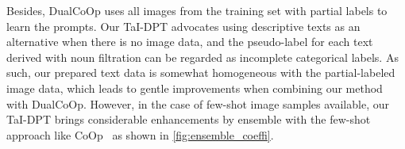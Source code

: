 \documentclass[10pt,twocolumn,letterpaper]{article}
\begin{document}
Besides, DualCoOp\cite{dualcoop} uses all images from the training set with partial labels to learn the prompts. Our TaI-DPT advocates using descriptive texts as an alternative when there is no image data, and the pseudo-label for each text derived with noun filtration can be regarded as incomplete categorical labels. As such, our prepared text data is somewhat homogeneous with the partial-labeled image data, which leads to gentle improvements when combining our method with DualCoOp. However, in the case of few-shot image samples available, our TaI-DPT brings considerable enhancements by ensemble with the few-shot approach like CoOp~\cite{coop} as shown in \cref{fig:ensemble_coeffi}.
\end{document}
